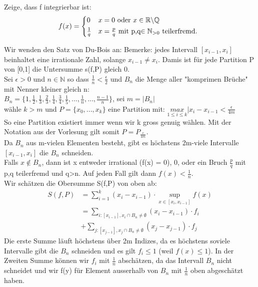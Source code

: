 \documentclass[a4paper,10pt]{article}
\def\R{\mathbb{R}}
\def\N{\mathbb{N}}
\begin{document}
\begin{subbox}{}
  Zeige, dass f integrierbar ist:
  \begin{equation*}
    f(x) =
    \begin{cases*}
      0 & $x=0$ oder $x\in\R \backslash \mathbb{Q}$\\
      \frac{1}{q} & $x=\frac{p}{q}$ mit p,q$\in \mathbb{N}_{>0}$ teilerfremd.
    \end{cases*}
  \end{equation*}
  
  Wir wenden den Satz von Du-Bois an:
  Bemerke: jedes Intervall $[x_{i-1}, x_i]$ beinhaltet eine irrationale Zahl, solange $x_{i-1} \neq x_i$. Damis ist für jede Partition P von [0,1] die Untersumme s(f,P) gleich 0.\\
  Sei $\epsilon > 0$ und $n\in \N$ so dass $\frac{1}{n} < \frac{\epsilon}{2}$ und $B_n$ die Menge aller "komprimen Brüche" mit Nenner kleiner gleich n:\\
  $B_n = \{1, \frac{1}{2}, \frac{1}{3}, \frac{2}{3}, \frac{1}{4},\frac{3}{4}, \frac{1}{5}, ..., \frac{1}{n}, ..., \frac{n-1}{n}\}$, sei $m = |B_n|$\\
  wähle $k>m$ und $P = \{x_0, ..., x_k\}$ eine Partition mit: $\underset{1\leq i\leq k}{max}|x_i - x_{i-1} < \frac{\epsilon}{4m}$\\
  So eine Partition existiert immer wenn wir k gross genuig wählen. Mit der Notation aus der Vorlesung gilt somit $ P = P_{\frac{e}{4m}}$.\\
  Da $B_n$ aus m-vielen Elementen besteht, gibt es höchstens 2m-viele Intervalle $[x_{i-1}, x_i]$ die $B_n$ schneiden.\\
  Falls $x\notin B_n$, dann ist x entweder irrational (f(x) = 0), 0, oder ein Bruch $\frac{p}{q}$ mit p,q teilerfremd und q>n. Auf jeden Fall gilt dann $f(x) < \frac{1}{n}$.\\
  Wir schätzen die Obersumme S(f,P) von oben ab:
  \begin{align*}
    S(f,P) &= \sum\limits_{i=1}^{k}(x_i - x_{i-1})\cdot \underset{x\in[x_i, x_{i-1}]}{\sup}f(x)\\
    &= \underset{i: [x_{i-1}], x_i \cap B_n \neq \emptyset}{\sum}(x_i - x_{i-1})\cdot f_i \\
    &+ \underset{j: [x_{j-1}], x_j \cap B_n \neq \emptyset}{\sum}(x_j - x_{j-1})\cdot f_j
  \end{align*}
  Die erste Summe läuft höchstens über 2m Indizes, da es höchstens soviele Intervalle gibt die $B_n$ schneiden und es gilt $f_i \leq 1$ (weil $f(x) \leq 1$). In der Zweiten Summe können wir $f_i$ mit $\frac{1}{n}$ abschätzen, da das Intervall $B_n$ nicht schneidet und wir f(y) für Element ausserhalb von $B_n$ mit $\frac{1}{n}$ oben abgeschätzt haben. 
\end{subbox}
\end{document}
